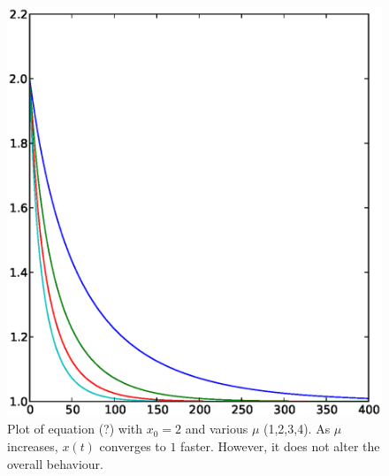 \documentclass[11pt]{article}
\begin{document}
\begin{figure}[h]
  \begin{center}
    \includegraphics[scale=0.5]{logistic_diffeq_mu1234_x2.eps}
  \end{center}
  \caption{
    Plot of equation (?) with $x_0 = 2$ and various $\mu$ (1,2,3,4).
    As $\mu$ increases, $x(t)$ converges to $1$ faster.
    However, it does not alter the overall behaviour.
  }
  \label{fig:logistic_diffeq2}
\end{figure}
\end{document}
